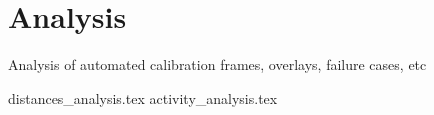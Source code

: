 \section{Analysis}

Analysis of automated calibration frames, overlays, failure cases, etc

{distances_analysis.tex}
\clearpage
{activity_analysis.tex}